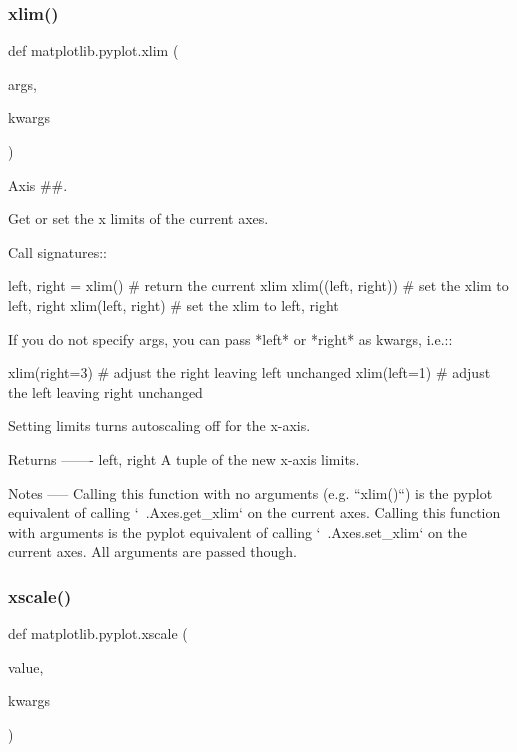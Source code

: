 \subsubsection{\texorpdfstring{xlim()}{xlim()}}
{\footnotesize\ttfamily def matplotlib.\+pyplot.\+xlim (\begin{DoxyParamCaption}\item[{}]{args,  }\item[{}]{kwargs }\end{DoxyParamCaption})}



Axis \#\#. 

\begin{DoxyVerb}Get or set the x limits of the current axes.

Call signatures::

    left, right = xlim()  # return the current xlim
    xlim((left, right))   # set the xlim to left, right
    xlim(left, right)     # set the xlim to left, right

If you do not specify args, you can pass *left* or *right* as kwargs,
i.e.::

    xlim(right=3)  # adjust the right leaving left unchanged
    xlim(left=1)  # adjust the left leaving right unchanged

Setting limits turns autoscaling off for the x-axis.

Returns
-------
left, right
    A tuple of the new x-axis limits.

Notes
-----
Calling this function with no arguments (e.g. ``xlim()``) is the pyplot
equivalent of calling `~.Axes.get_xlim` on the current axes.
Calling this function with arguments is the pyplot equivalent of calling
`~.Axes.set_xlim` on the current axes. All arguments are passed though.
\end{DoxyVerb}
 \mbox{\label{namespacematplotlib_1_1pyplot_a6d54552b1357cca77dacd8a7b8eb1b0a}} 
\subsubsection{\texorpdfstring{xscale()}{xscale()}}
{\footnotesize\ttfamily def matplotlib.\+pyplot.\+xscale (\begin{DoxyParamCaption}\item[{}]{value,  }\item[{}]{kwargs }\end{DoxyParamCaption})}

